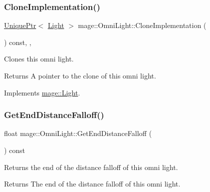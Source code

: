 \subsubsection{\texorpdfstring{Clone\+Implementation()}{CloneImplementation()}}
{\footnotesize\ttfamily \hyperlink{namespacemage_a8c307fbcc33bce9b7f2aa4c26c3b95cf}{Unique\+Ptr}$<$ \hyperlink{classmage_1_1_light}{Light} $>$ mage\+::\+Omni\+Light\+::\+Clone\+Implementation (\begin{DoxyParamCaption}{ }\end{DoxyParamCaption}) const\hspace{0.3cm}{\ttfamily [override]}, {\ttfamily [private]}, {\ttfamily [virtual]}}

Clones this omni light.

\begin{DoxyReturn}{Returns}
A pointer to the clone of this omni light. 
\end{DoxyReturn}


Implements \hyperlink{classmage_1_1_light_aa613d76a1ebda69efde853d15f75490c}{mage\+::\+Light}.

\hypertarget{classmage_1_1_omni_light_ac3a8638331aa35ffd8967ccc78ca2df7}{}\label{classmage_1_1_omni_light_ac3a8638331aa35ffd8967ccc78ca2df7} 
\subsubsection{\texorpdfstring{Get\+End\+Distance\+Falloff()}{GetEndDistanceFalloff()}}
{\footnotesize\ttfamily float mage\+::\+Omni\+Light\+::\+Get\+End\+Distance\+Falloff (\begin{DoxyParamCaption}{ }\end{DoxyParamCaption}) const}

Returns the end of the distance falloff of this omni light.

\begin{DoxyReturn}{Returns}
The end of the distance falloff of this omni light. 
\end{DoxyReturn}
\hypertarget{classmage_1_1_omni_light_ab37a3e3880f519f40f9c9eaa786ba769}{}\label{classmage_1_1_omni_light_ab37a3e3880f519f40f9c9eaa786ba769} 
